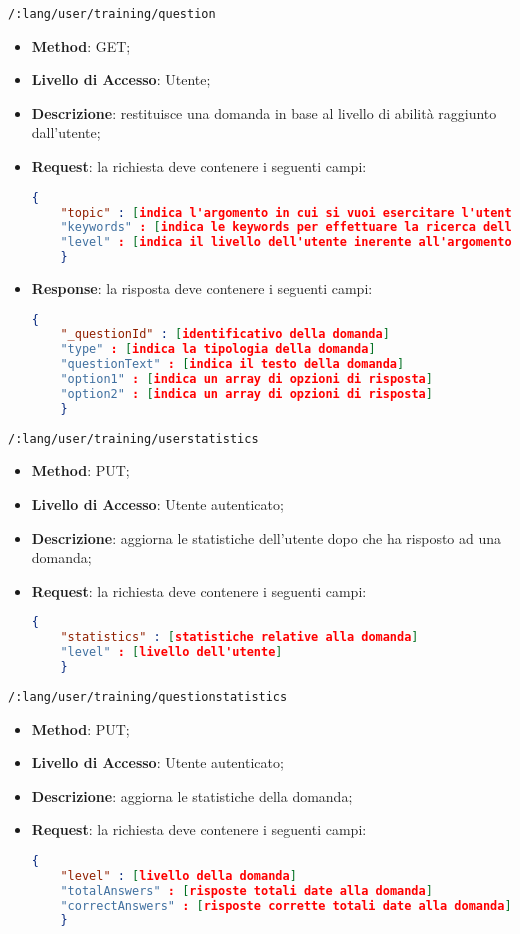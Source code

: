 \item \texttt{/:lang/user/training/question}
\begin{itemize}
	\item \textbf{Method}: GET;
	\item \textbf{Livello di Accesso}: Utente;
	\item \textbf{Descrizione}: restituisce una domanda in base al livello di abilità raggiunto dall'utente;
	\item \textbf{Request}: la richiesta deve contenere i seguenti campi:
	\begin{lstlisting}[language=json,firstnumber=1]
	{
	"topic" : [indica l'argomento in cui si vuoi esercitare l'utente]
	"keywords" : [indica le keywords per effettuare la ricerca della domanda]
	"level" : [indica il livello dell'utente inerente all'argomento scelto]
	}
	\end{lstlisting}
	\item \textbf{Response}: la risposta deve contenere i seguenti campi:
	\begin{lstlisting}[language=json,firstnumber=1]
	{
	"_questionId" : [identificativo della domanda]
	"type" : [indica la tipologia della domanda]
	"questionText" : [indica il testo della domanda]
	"option1" : [indica un array di opzioni di risposta]
	"option2" : [indica un array di opzioni di risposta]
	}
	\end{lstlisting}
\end{itemize}

\item \texttt{/:lang/user/training/userstatistics}
\begin{itemize}
	\item \textbf{Method}: PUT;
	\item \textbf{Livello di Accesso}: Utente autenticato;
	\item \textbf{Descrizione}: aggiorna le statistiche dell'utente dopo che ha risposto ad una domanda;
	\item \textbf{Request}: la richiesta deve contenere i seguenti campi:
	\begin{lstlisting}[language=json,firstnumber=1]
	{
	"statistics" : [statistiche relative alla domanda]
	"level" : [livello dell'utente]
	}
	\end{lstlisting}	
\end{itemize}

\item \texttt{/:lang/user/training/questionstatistics}
\begin{itemize}
	\item \textbf{Method}: PUT;
	\item \textbf{Livello di Accesso}: Utente autenticato;
	\item \textbf{Descrizione}: aggiorna le statistiche della domanda;
	\item \textbf{Request}: la richiesta deve contenere i seguenti campi:
	\begin{lstlisting}[language=json,firstnumber=1]
	{
	"level" : [livello della domanda]
	"totalAnswers" : [risposte totali date alla domanda]
	"correctAnswers" : [risposte corrette totali date alla domanda]
	}
	\end{lstlisting}
\end{itemize}

